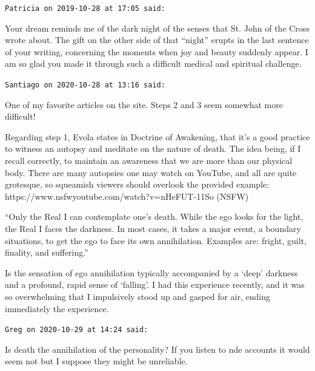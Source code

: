 \begin{footnotesize}\begin{sffamily}



\texttt{Patricia on 2019-10-28 at 17:05 said: }

Your dream reminds me of the dark night of the senses that St. John of the Cross wrote about. The gift on the other side of that “night” erupts in the last sentence of your writing, concerning the moments when joy and beauty suddenly appear. I am so glad you made it through such a difficult medical and spiritual challenge.


\hfill

\texttt{Santiago on 2020-10-28 at 13:16 said: }

One of my favorite articles on the site. Steps 2 and 3 seem somewhat more difficult!

Regarding step 1, Evola states in Doctrine of Awakening, that it's a good practice to witness an autopsy and meditate on the nature of death. The idea being, if I recall correctly, to maintain an awareness that we are more than our physical body. There are many autopsies one may watch on YouTube, and all are quite grotesque, so squeamish viewers should overlook the provided example: https://www.nsfwyoutube.com/watch?v=nHeFUT-11So (NSFW)

“Only the Real I can contemplate one's death. While the ego looks for the light, the Real I faces the darkness. In most cases, it takes a major event, a boundary situations, to get the ego to face its own annihilation. Examples are: fright, guilt, finality, and suffering.”

Is the sensation of ego annihilation typically accompanied by a `deep' darkness and a profound, rapid sense of `falling'. I had this experience recently, and it was so overwhelming that I impulsively stood up and gasped for air, ending immediately the experience.


\hfill

\texttt{Greg on 2020-10-29 at 14:24 said: }

Is death the annihilation of the personality? If you listen to nde accounts it would seem not but I suppose they might be unreliable.


\end{sffamily}\end{footnotesize}
